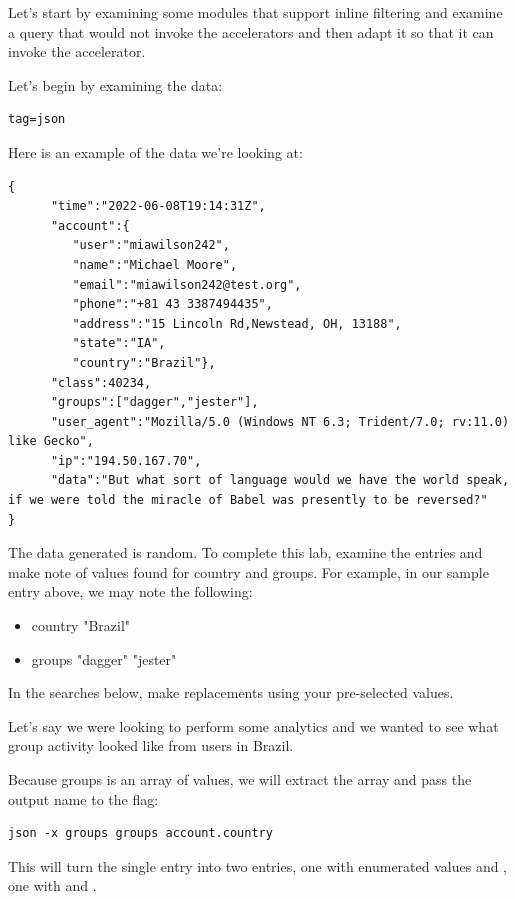 Let's start by examining some modules that support inline filtering and
examine a query that would not invoke the accelerators and then adapt it
so that it can invoke the accelerator. 

Let's begin by examining the data:

\begin{Verbatim}
tag=json
\end{Verbatim}

Here is an example of the data we're looking at:

\begin{Verbatim}[breaklines=true]
{
      "time":"2022-06-08T19:14:31Z",
      "account":{
         "user":"miawilson242",
         "name":"Michael Moore",
         "email":"miawilson242@test.org",
         "phone":"+81 43 3387494435",
         "address":"15 Lincoln Rd,Newstead, OH, 13188", 
         "state":"IA",
         "country":"Brazil"},
      "class":40234,
      "groups":["dagger","jester"],
      "user_agent":"Mozilla/5.0 (Windows NT 6.3; Trident/7.0; rv:11.0) like Gecko",
      "ip":"194.50.167.70",
      "data":"But what sort of language would we have the world speak, if we were told the miracle of Babel was presently to be reversed?"
}
\end{Verbatim}

The data generated is random. To complete this lab, examine the entries and make note of values found for country and groups.
For example, in our sample entry above, we may note the following:
\begin{itemize}
\item country
\subitem "Brazil"
\item groups
\subitem "dagger"
\subitem "jester"
\end{itemize}

In the searches below, make replacements using your pre-selected values.

Let's say we were looking to perform some analytics and we wanted to see
what group activity looked like from users in Brazil. 

Because groups is an array of values, we will extract 
the array and pass the output name to the  flag:

\begin{Verbatim}
json -x groups groups account.country
\end{Verbatim}

This will turn the single entry into two entries, one with enumerated values  and
, one with  and . 

